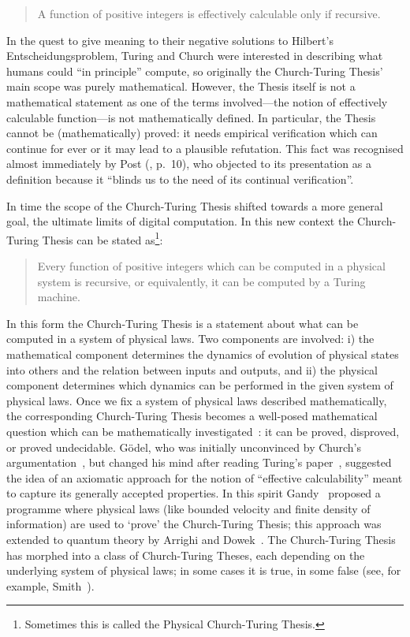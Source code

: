 \documentclass[10pt]{article}
\begin{document}
\begin{quote}
A function of positive integers is effectively calculable only if recursive.
\end{quote}

  In the quest to give meaning to their negative solutions to Hilbert's Entscheidungsproblem,  Turing and Church were interested in describing what humans could ``in principle'' compute, so originally the Church-Turing Thesis' main scope was purely mathematical. However, the Thesis itself is  not a mathematical statement as one of the terms involved---the notion of  effectively calculable function---is
not mathematically defined. In particular,  the Thesis cannot be (mathematically) proved: it needs empirical verification which can continue for ever or it may lead to a plausible refutation. This fact was recognised almost immediately by
Post (\cite{post-1936}, p.\ 10), who  objected to its presentation as a definition because it ``blinds us to the need of its continual verification''.

In time the scope of the  Church-Turing Thesis shifted towards a more general goal, the ultimate limits of digital computation. In this  new context the  Church-Turing Thesis can be stated as\footnote{Sometimes this is called the Physical Church-Turing Thesis.}:

\begin{quote}
Every function  of positive integers which can be computed in a  physical system is recursive, or equivalently,  it can be computed by a Turing machine.
\end{quote}

 In this form the Church-Turing Thesis is a statement  about what can be computed in a system of physical laws. Two components are involved: i) the mathematical component  determines the dynamics of evolution of  physical states into others and the relation between inputs and outputs, and ii) the physical component determines which dynamics can be performed in  the given system of physical laws.  Once we fix a system of physical laws described mathematically, the corresponding Church-Turing Thesis becomes a well-posed mathematical question which can be mathematically investigated~\cite{yao-2003}: it can be proved, disproved, or proved undecidable.
 G\"odel, who was initially unconvinced by Church's argumentation~\cite{church30}, but changed his mind after reading Turing's paper~\cite{turing-36},  suggested the idea of an axiomatic approach for the notion of
``effective calculability'' meant to capture its generally accepted properties. In this spirit  Gandy~\cite{gandy2}
 proposed a programme where physical laws (like bounded velocity and finite density of information) are used to
`prove' the Church-Turing Thesis; this approach was extended to quantum theory by Arrighi and Dowek~\cite{arrighi-dowek}.
  The
 Church-Turing Thesis has morphed into a class of Church-Turing Theses, each depending on the underlying system of physical laws;
 in some cases it is true, in some false (see, for example, Smith~\cite{Smith2006154}).
\end{document}
